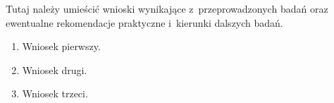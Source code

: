 
Tutaj należy umieścić wnioski wynikające z~przeprowadzonych badań oraz ewentualne
rekomendacje praktyczne i~kierunki dalszych badań.

\begin{enumerate}
  \item Wniosek pierwszy.
  \item Wniosek drugi.
  \item Wniosek trzeci.
\end{enumerate}
